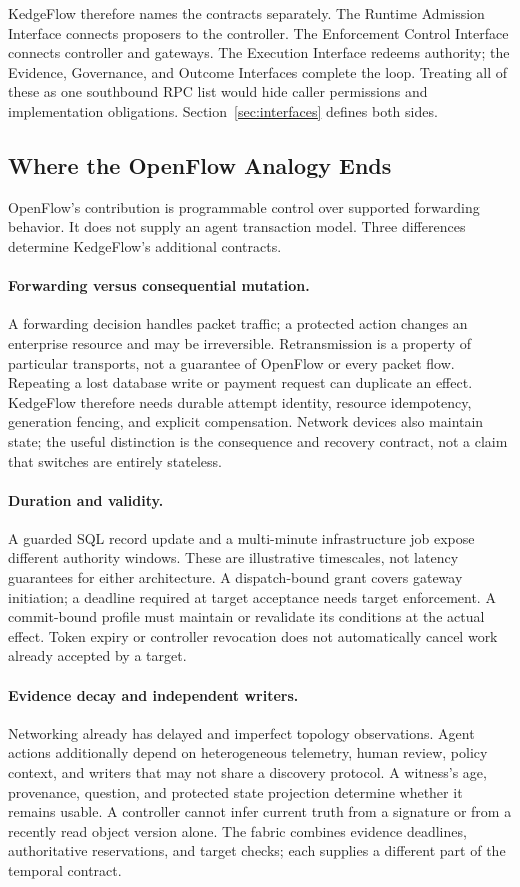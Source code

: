 KedgeFlow therefore names the contracts separately. The Runtime Admission Interface connects proposers to the controller. The Enforcement Control Interface connects controller and gateways. The Execution Interface redeems authority; the Evidence, Governance, and Outcome Interfaces complete the loop. Treating all of these as one southbound RPC list would hide caller permissions and implementation obligations. Section~\ref{sec:interfaces} defines both sides.

\subsection{Where the OpenFlow Analogy Ends}
OpenFlow's contribution is programmable control over supported forwarding behavior. It does not supply an agent transaction model. Three differences determine KedgeFlow's additional contracts.

\paragraph{Forwarding versus consequential mutation.}
A forwarding decision handles packet traffic; a protected action changes an enterprise resource and may be irreversible. Retransmission is a property of particular transports, not a guarantee of OpenFlow or every packet flow. Repeating a lost database write or payment request can duplicate an effect. KedgeFlow therefore needs durable attempt identity, resource idempotency, generation fencing, and explicit compensation. Network devices also maintain state; the useful distinction is the consequence and recovery contract, not a claim that switches are entirely stateless.

\paragraph{Duration and validity.}
A guarded SQL record update and a multi-minute infrastructure job expose different authority windows. These are illustrative timescales, not latency guarantees for either architecture. A dispatch-bound grant covers gateway initiation; a deadline required at target acceptance needs target enforcement. A commit-bound profile must maintain or revalidate its conditions at the actual effect. Token expiry or controller revocation does not automatically cancel work already accepted by a target.

\paragraph{Evidence decay and independent writers.}
Networking already has delayed and imperfect topology observations. Agent actions additionally depend on heterogeneous telemetry, human review, policy context, and writers that may not share a discovery protocol. A witness's age, provenance, question, and protected state projection determine whether it remains usable. A controller cannot infer current truth from a signature or from a recently read object version alone. The fabric combines evidence deadlines, authoritative reservations, and target checks; each supplies a different part of the temporal contract.

